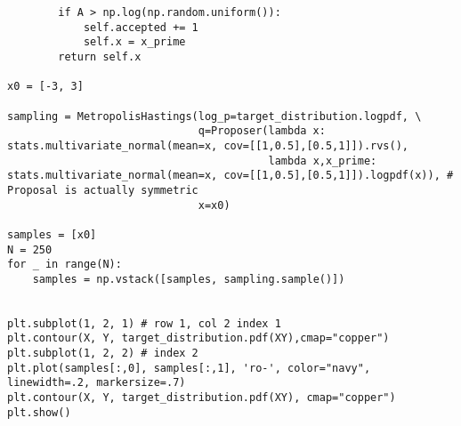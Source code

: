 \begin{appendices}
\begin{lstlisting}
        if A > np.log(np.random.uniform()):
            self.accepted += 1
            self.x = x_prime
        return self.x

x0 = [-3, 3]

sampling = MetropolisHastings(log_p=target_distribution.logpdf, \
                              q=Proposer(lambda x: stats.multivariate_normal(mean=x, cov=[[1,0.5],[0.5,1]]).rvs(),
                                         lambda x,x_prime: stats.multivariate_normal(mean=x, cov=[[1,0.5],[0.5,1]]).logpdf(x)), # Proposal is actually symmetric
                              x=x0)

samples = [x0]
N = 250
for _ in range(N):
    samples = np.vstack([samples, sampling.sample()])
    

plt.subplot(1, 2, 1) # row 1, col 2 index 1
plt.contour(X, Y, target_distribution.pdf(XY),cmap="copper")
plt.subplot(1, 2, 2) # index 2
plt.plot(samples[:,0], samples[:,1], 'ro-', color="navy", linewidth=.2, markersize=.7)
plt.contour(X, Y, target_distribution.pdf(XY), cmap="copper")
plt.show()
\end{lstlisting}








\end{appendices}
